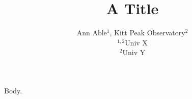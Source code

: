 \documentclass{article}
\begin{document}
\title{A Title}
\author{Ann Able$^{1}$, Kitt Peak Observatory$^{2}$\\ $^{1,2}$Univ X\\ $^2$Univ Y}
\maketitle
Body.
\end{document}
